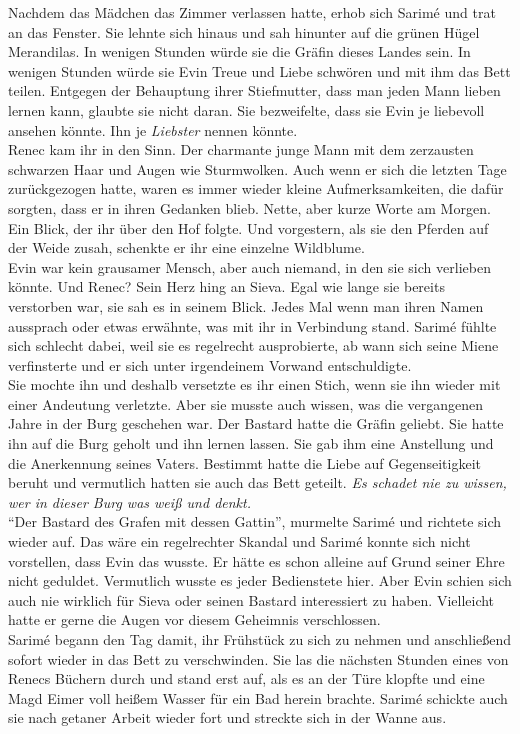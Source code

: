 Nachdem das Mädchen das Zimmer verlassen hatte, erhob sich Sarimé und trat an das Fenster. Sie 
lehnte sich hinaus und sah hinunter auf die grünen Hügel Merandilas. In wenigen Stunden würde sie 
die Gräfin dieses Landes sein. In wenigen Stunden würde sie Evin Treue und Liebe schwören und mit 
ihm das Bett teilen. Entgegen der Behauptung ihrer Stiefmutter, dass man jeden Mann lieben lernen 
kann, glaubte sie nicht daran. Sie bezweifelte, dass sie Evin je liebevoll ansehen könnte. Ihn je 
\emph{Liebster} nennen könnte.\\
Renec kam ihr in den Sinn. Der charmante junge Mann mit dem zerzausten schwarzen Haar und Augen wie 
Sturmwolken. Auch wenn er sich die letzten Tage zurückgezogen hatte, waren es immer wieder kleine 
Aufmerksamkeiten, die dafür sorgten, dass er in ihren Gedanken blieb. Nette, aber kurze Worte am 
Morgen. Ein Blick, der ihr über den Hof folgte. Und vorgestern, als sie den Pferden auf der Weide 
zusah, schenkte er ihr eine einzelne Wildblume.\\
Evin war kein grausamer Mensch, aber auch niemand, in den sie sich verlieben könnte. Und Renec? 
Sein Herz hing an Sieva. Egal wie lange sie bereits verstorben war, sie sah es in seinem Blick. 
Jedes Mal wenn man ihren Namen aussprach oder etwas erwähnte, was mit ihr in Verbindung stand. 
Sarimé fühlte sich schlecht dabei, weil sie es regelrecht ausprobierte, ab wann sich seine Miene 
verfinsterte und er sich unter irgendeinem Vorwand entschuldigte.\\
Sie mochte ihn und deshalb versetzte es ihr einen Stich, wenn sie ihn wieder mit einer Andeutung 
verletzte. Aber sie musste auch wissen, was die vergangenen Jahre in der Burg geschehen war. Der 
Bastard hatte die Gräfin geliebt. Sie hatte ihn auf die Burg geholt und ihn lernen lassen. Sie gab 
ihm eine Anstellung und die Anerkennung seines Vaters. Bestimmt hatte die Liebe auf Gegenseitigkeit 
beruht und vermutlich hatten sie auch das Bett geteilt. \textit{Es schadet nie zu wissen, wer in 
dieser Burg was weiß und denkt.}\\
``Der Bastard des Grafen mit dessen Gattin'', murmelte Sarimé und richtete sich wieder auf. Das 
wäre ein regelrechter Skandal und Sarimé konnte sich nicht vorstellen, dass Evin das wusste. Er 
hätte es schon alleine auf Grund seiner Ehre nicht geduldet. Vermutlich wusste es jeder Bedienstete 
hier. Aber Evin schien sich auch nie wirklich für Sieva oder seinen Bastard interessiert zu haben. 
Vielleicht hatte er gerne die Augen vor diesem Geheimnis verschlossen.\\
Sarimé begann den Tag damit, ihr Frühstück zu sich zu nehmen und anschließend sofort wieder in das 
Bett zu verschwinden. Sie las die nächsten Stunden eines von Renecs Büchern durch und stand erst 
auf, als es an der Türe klopfte und eine Magd Eimer voll heißem Wasser für ein Bad herein brachte. 
Sarimé schickte auch sie nach getaner Arbeit wieder fort und streckte sich in der Wanne aus.\\

